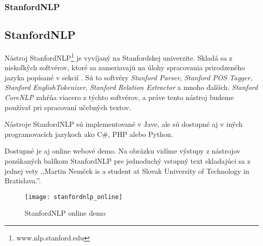%
%
{
	\subsubsection{StanfordNLP}
}
{
	\subsection{StanfordNLP}
}
\label{subsubsec:stanfordnlp}
Nástroj StanfordNLP\footnote{www.nlp.stanford.edu} je vyvíjaný na Stanfordskej univerzite. Skladá sa z niekoľkých softvérov, ktoré sa zameriavajú na úlohy spracovania prirodzeného jazyka popísané v sekcií . Sú to softvéry \textit{Stanford Parser}, \textit{Stanford POS Tagger}, \textit{Stanford EnglishTokenizer}, \textit{Stanford Relation Extractor} a mnoho ďalších. \textit{Stanford CoreNLP} zahŕňa viacero z týchto softvérov, a práve tento nástroj budeme používať pri spracovaní učebných textov.

Nástroje StanfordNLP sú implementované v Jave, ale sú dostupné aj v iných programovacích jazykoch ako C\#, PHP alebo Python.

Dostupné je aj online webové demo. Na obrázku  vidíme výstupy z nástrojov ponúkaných balíkom StanfordNLP pre jednoduchý vstupný text skladajúci sa z jednej vety ,,Martin Nemček is a student at Slovak University of Technology in Bratislava.''.

\begin{figure}[H]
\begin{center}\texttt{[image: stanfordnlp\_online]}\end{center}
\caption[StanfordNLP online demo]{StanfordNLP online demo}\label{fig:stanfordnlp_online_demo}
\end{figure}

